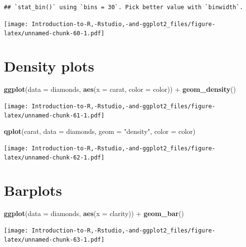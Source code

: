 \documentclass[]{book}
\newenvironment{Shaded}{\begin{snugshade}}{\end{snugshade}}
\newcommand{\KeywordTok}[1]{\textcolor[rgb]{0.13,0.29,0.53}{\textbf{{#1}}}}
\newcommand{\DataTypeTok}[1]{\textcolor[rgb]{0.13,0.29,0.53}{{#1}}}
\newcommand{\StringTok}[1]{\textcolor[rgb]{0.31,0.60,0.02}{{#1}}}
\newcommand{\NormalTok}[1]{{#1}}
\begin{document}
\begin{verbatim}
## `stat_bin()` using `bins = 30`. Pick better value with `binwidth`.
\end{verbatim}

\texttt{[image: Introduction-to-R,-Rstudio,-and-ggplot2\_files/figure-latex/unnamed-chunk-60-1.pdf]}

\section{Density plots}\label{density-plots}

\begin{Shaded}
\begin{Highlighting}[]
\KeywordTok{ggplot}\NormalTok{(}\DataTypeTok{data =} \NormalTok{diamonds, }\KeywordTok{aes}\NormalTok{(}\DataTypeTok{x =} \NormalTok{carat, }\DataTypeTok{color =} \NormalTok{color)) +}\StringTok{ }\KeywordTok{geom_density}\NormalTok{() }
\end{Highlighting}
\end{Shaded}

\texttt{[image: Introduction-to-R,-Rstudio,-and-ggplot2\_files/figure-latex/unnamed-chunk-61-1.pdf]}

\begin{Shaded}
\begin{Highlighting}[]
\KeywordTok{qplot}\NormalTok{(carat, }\DataTypeTok{data =} \NormalTok{diamonds, }\DataTypeTok{geom =} \StringTok{"density"}\NormalTok{, }\DataTypeTok{color =} \NormalTok{color)}
\end{Highlighting}
\end{Shaded}

\texttt{[image: Introduction-to-R,-Rstudio,-and-ggplot2\_files/figure-latex/unnamed-chunk-62-1.pdf]}

\section{Barplots}\label{barplots}

\begin{Shaded}
\begin{Highlighting}[]
\KeywordTok{ggplot}\NormalTok{(}\DataTypeTok{data =} \NormalTok{diamonds, }\KeywordTok{aes}\NormalTok{(}\DataTypeTok{x =} \NormalTok{clarity)) +}\StringTok{ }\KeywordTok{geom_bar}\NormalTok{() }
\end{Highlighting}
\end{Shaded}

\texttt{[image: Introduction-to-R,-Rstudio,-and-ggplot2\_files/figure-latex/unnamed-chunk-63-1.pdf]}
\end{document}
